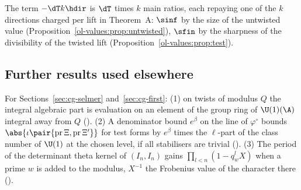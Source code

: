 \begin{remark}\label{ol-values:rem:main}
The term $-\dT k\hdir$ is $\dT$ times $k$ main ratios, each repaying one of the $k$
directions charged per lift in Theorem~A: $\sinf$ by the size
of the untwisted value (Proposition~\ref{ol-values:prop:untwisted}), $\sfin$
by the sharpness of the divisibility of the twisted lift (Proposition~\ref{ol-values:prop:test}).
\end{remark}

\subsection{Further results used elsewhere}

For Sections~\ref{sec:cg-selmer} and~\ref{sec:cg-first}: (1) on twists of modulus $Q$ the integral
algebraic part is evaluation on an element of the group ring of $\U(1)(\A)$ integral away from $Q$
(). (2) A
denominator bound $e^\beta$ on the line of $\varphi^\circ$ bounds $\abs{\iota\pair{\mathrm{pr}\,\Xi,
\mathrm{pr}\,\Xi'}}$ for test forms by $e^\beta$ times the $\ell$-part of the class number of $\U(1)$
at the chosen level, if all stabilisers are trivial
(). (3) The period of the determinant
theta kernel of $(I_n,I_n)$ gains $\prod_{l<n}(1-q_w^lX)$ when a prime $w$ is added to the modulus,
$X^{-1}$ the Frobenius value of the character there
().
